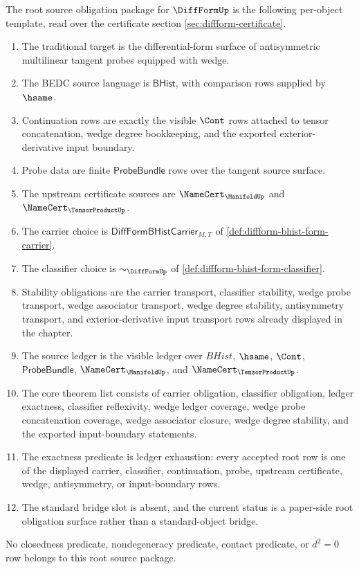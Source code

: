 \begin{definition}
\label{def:diffform-root-source-obligation-package}
The root source obligation package for $\DiffFormUp$ is the following
per-object template, read over the certificate section
\autoref{sec:diffform-certificate}.
\begin{enumerate}
  \item The traditional target is the differential-form surface of
  antisymmetric multilinear tangent probes equipped with wedge.
  \item The BEDC source language is $\mathsf{BHist}$, with comparison rows
  supplied by $\hsame$.
  \item Continuation rows are exactly the visible $\Cont$ rows attached to
  tensor concatenation, wedge degree bookkeeping, and the exported
  exterior-derivative input boundary.
  \item Probe data are finite $\mathsf{ProbeBundle}$ rows over the tangent
  source surface.
  \item The upstream certificate sources are
  $\NameCert_{\ManifoldUp}$ and $\NameCert_{\TensorProductUp}$.
  \item The carrier choice is
  $\mathsf{DiffFormBHistCarrier}_{M,T}$ of
  \autoref{def:diffform-bhist-form-carrier}.
  \item The classifier choice is $\sim_{\DiffFormUp}$ of
  \autoref{def:diffform-bhist-form-classifier}.
  \item Stability obligations are the carrier transport, classifier
  stability, wedge probe transport, wedge associator transport, wedge degree
  stability, antisymmetry transport, and exterior-derivative input transport
  rows already displayed in the chapter.
  \item The source ledger is the visible ledger over $BHist$, $\hsame$,
  $\Cont$, $\mathsf{ProbeBundle}$, $\NameCert_{\ManifoldUp}$, and
  $\NameCert_{\TensorProductUp}$.
  \item The core theorem list consists of carrier obligation, classifier
  obligation, ledger exactness, classifier reflexivity, wedge ledger
  coverage, wedge probe concatenation coverage, wedge associator closure,
  wedge degree stability, and the exported input-boundary statements.
  \item The exactness predicate is ledger exhaustion: every accepted root row
  is one of the displayed carrier, classifier, continuation, probe, upstream
  certificate, wedge, antisymmetry, or input-boundary rows.
  \item The standard bridge slot is absent, and the current status is a
  paper-side root obligation surface rather than a standard-object bridge.
\end{enumerate}
No closedness predicate, nondegeneracy predicate, contact predicate, or
$d^2=0$ row belongs to this root source package.
\end{definition}

